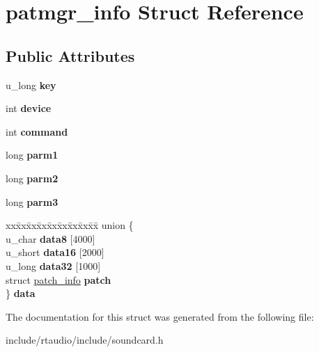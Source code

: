 \hypertarget{structpatmgr__info}{}\section{patmgr\+\_\+info Struct Reference}
\label{structpatmgr__info}
\subsection*{Public Attributes}
\begin{DoxyCompactItemize}
\item 
u\+\_\+long {\bfseries key}\hypertarget{structpatmgr__info_a9e39ff3efbd03da7517a799d04ec0891}{}\label{structpatmgr__info_a9e39ff3efbd03da7517a799d04ec0891}

\item 
int {\bfseries device}\hypertarget{structpatmgr__info_adf4cd28d639a39b7b1c818e70a641be2}{}\label{structpatmgr__info_adf4cd28d639a39b7b1c818e70a641be2}

\item 
int {\bfseries command}\hypertarget{structpatmgr__info_a16b5a22b2735601c3d9801a322b4bdc8}{}\label{structpatmgr__info_a16b5a22b2735601c3d9801a322b4bdc8}

\item 
long {\bfseries parm1}\hypertarget{structpatmgr__info_ab6a418f29f338651e216362818bc7d73}{}\label{structpatmgr__info_ab6a418f29f338651e216362818bc7d73}

\item 
long {\bfseries parm2}\hypertarget{structpatmgr__info_ac502f54a104ec5c64a44c5e8fe6603c4}{}\label{structpatmgr__info_ac502f54a104ec5c64a44c5e8fe6603c4}

\item 
long {\bfseries parm3}\hypertarget{structpatmgr__info_a22f2ea9cd659c6e7e8477c859fc5b95c}{}\label{structpatmgr__info_a22f2ea9cd659c6e7e8477c859fc5b95c}

\item 
\begin{tabbing}
xx\=xx\=xx\=xx\=xx\=xx\=xx\=xx\=xx\=\kill
union \{\\
\>u\_char {\bfseries data8} \mbox{[}4000\mbox{]}\\
\>u\_short {\bfseries data16} \mbox{[}2000\mbox{]}\\
\>u\_long {\bfseries data32} \mbox{[}1000\mbox{]}\\
\>struct \hyperlink{structpatch__info}{patch\_info} {\bfseries patch}\\
\} {\bfseries data}\hypertarget{structpatmgr__info_ab714285b996925e43b5a247fb871b77a}{}\label{structpatmgr__info_ab714285b996925e43b5a247fb871b77a}
\\

\end{tabbing}\end{DoxyCompactItemize}


The documentation for this struct was generated from the following file\+:\begin{DoxyCompactItemize}
\item 
include/rtaudio/include/soundcard.\+h\end{DoxyCompactItemize}
